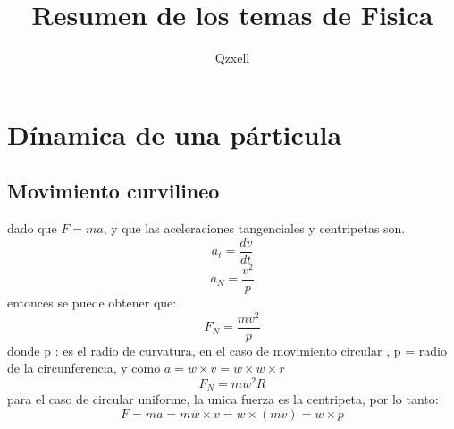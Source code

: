 \documentclass{book}
\author{ Qzxell}
\title{Resumen de los temas de Fisica}
\begin{document}
\maketitle
\tableofcontents
\chapter{D\'inamica de una p\'articula}
\section{Movimiento curvilineo}
dado que $F=ma$, y que las aceleraciones tangenciales y centripetas son. 
\[ a_{t}=\frac{dv}{dt}\]
\[a_{N}=\frac{v^{2}}{p} \]
entonces se puede obtener que:
\[F_{N}=\dfrac{mv^{2}}{p}\]
donde p : es el radio de curvatura, en el caso de movimiento circular , p = radio de la circunferencia, y como $a=w \times v=w \times w \times r$
\[
F_{N}=mw^{2}R
\]
para el caso de circular uniforme, la unica fuerza es la centripeta, por lo tanto:
\[
F=ma=mw \times v=w\times (mv)=w\times p
\]

\end{document}
